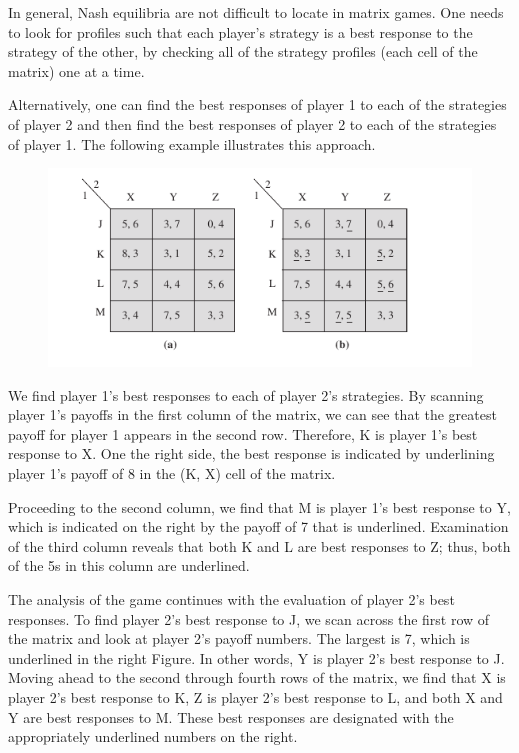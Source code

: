 In general, Nash equilibria are not difficult to locate in matrix games. One needs to look for profiles such that each player’s strategy is a best response to the strategy of the other, by checking all of the strategy profiles (each cell of the matrix) one at a time.

Alternatively, one can find the best responses of player 1 to each of the strategies of player 2 and then find the best responses of player 2 to each of the strategies of player 1. The following example illustrates this approach.

\begin{figure}[H]
    \centering
    \includegraphics[scale=0.7]{images/2023-11-21-game_theory_05.png}
\end{figure}

We find player 1’s best responses to each of player 2’s strategies. By scanning player 1’s payoffs in the first column of the matrix, we can see that the greatest payoff for player 1 appears in the second row. Therefore, K is player 1’s best response to X. One the right side, the best response is indicated by underlining player 1’s payoff of 8 in the (K, X) cell of the matrix. 

Proceeding to the second column, we find that M is player 1’s best response to Y, which is indicated on the right by the payoff of 7 that is underlined. Examination of the third column reveals that both K and L are best responses to Z; thus, both of the 5s in this column are underlined.

The analysis of the game continues with the evaluation of player 2’s best responses. To find player 2’s best response to J, we scan across the first row of the matrix and look at player 2’s payoff numbers. The largest is 7, which is underlined in the right Figure. In other words, Y is player 2’s best response to J. Moving ahead to the second through fourth rows of the matrix, we find that X is player 2’s best response to K, Z is player 2’s best response to L, and both X and Y are best responses to M. These best responses are designated with the appropriately underlined numbers on the right.

